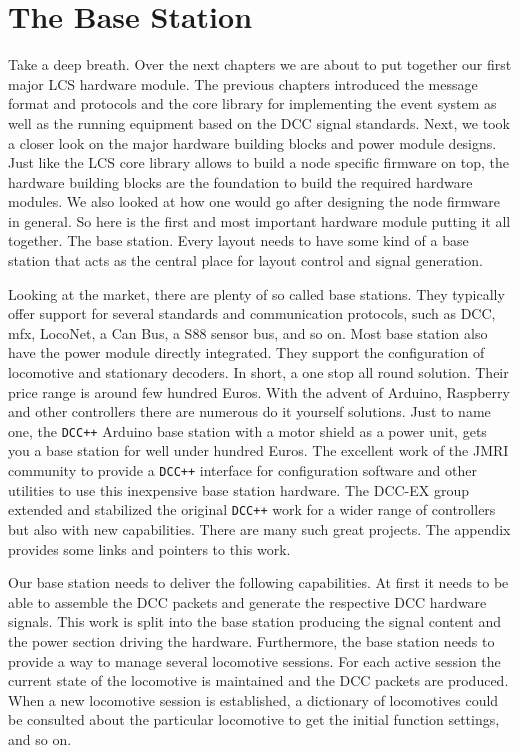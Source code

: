 \chapter*{The Base Station}

Take a deep breath. Over the next chapters we are about to put together our first major LCS hardware module. The previous chapters introduced the message format and protocols and the core library for implementing the event system as well as the running equipment based on the DCC signal standards. Next, we took a closer look on the major hardware building blocks and power module designs. Just like the LCS core library allows to build a node specific firmware on top, the hardware building blocks are the foundation to build the required hardware modules. We also looked at how one would go after designing the node firmware in general. So here is the first and most important hardware module putting it all together. The base station. Every layout needs to have some kind of a base station that acts as the central place for layout control and signal generation.

Looking at the market, there are plenty of so called base stations. They typically offer support for several standards and communication protocols, such as DCC, mfx, LocoNet, a Can Bus, a S88 sensor bus, and so on. Most base station also have the power module directly integrated. They support the configuration of locomotive and stationary decoders. In short, a one stop all round solution. Their price range is around few hundred Euros. With the advent of Arduino, Raspberry and other controllers there are numerous do it yourself solutions. Just to name one, the \texttt{DCC++} Arduino base station with a motor shield as a power unit, gets you a base station for well under hundred Euros. The excellent work of the JMRI community to provide a \texttt{DCC++} interface for configuration software and other utilities to use this inexpensive base station hardware. The DCC-EX group extended and stabilized the original \texttt{DCC++} work for a wider range of controllers but also with new capabilities. There are many such great projects. The appendix provides some links and pointers to this work.

Our base station needs to deliver the following capabilities. At first it needs to be able to assemble the DCC packets and generate the respective DCC hardware signals. This work is split into the base station producing the signal content and the power section driving the hardware. Furthermore, the base station needs to provide a way to manage several locomotive sessions. For each active session the current state of the locomotive is maintained and the DCC packets are produced. When a new locomotive session is established, a dictionary of locomotives could be consulted about the particular locomotive to get the initial function settings, and so on.

